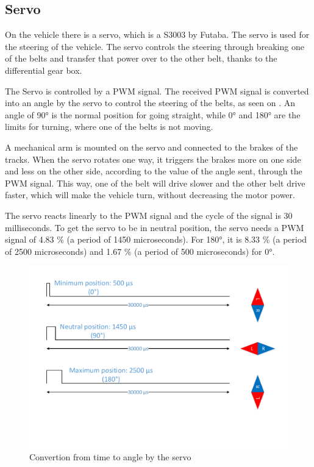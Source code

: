 \subsection{Servo}
On the vehicle there is a servo, which is a S3003 by Futaba.
The servo is used for the steering of the vehicle. The servo controls the steering through breaking one of the belts and transfer that power over to the other belt, thanks to the differential gear box.


The Servo is controlled by a PWM signal. The received PWM signal is converted into an angle by the servo to control the steering of the belts, as seen on . An angle of 90° is the normal position for going straight, while 0° and 180° are the limits for turning, where one of the belts is not moving. 

A mechanical arm is mounted on the servo and connected to the brakes of the tracks. When the servo rotates one way, it triggers the brakes more on one side and less on the other side, according to the value of the angle sent, through the PWM signal. This way, one of the belt will drive slower and the other belt drive faster, which will make the vehicle turn, without decreasing the motor power.

The servo reacts linearly to the PWM signal and the cycle of the signal is 30 milliseconds. To get the servo to be in neutral position, the servo needs a PWM signal of 4.83 \% (a period of 1450 microseconds). For 180°, it is 8.33 \% (a period of 2500 microseconds) and 1.67 \% (a period of 500 microseconds) for 0°. \\


\begin{figure}[H]
	\centering
	\includegraphics[scale=0.6]{figures/TimeVSangle.pdf}
	\caption{Convertion from time to angle by the servo}
	\label{timeVSangle}
\end{figure}

